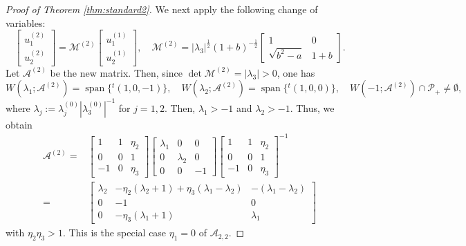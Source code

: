 \documentclass[11pt,a4paper,twosides]{amsart}
\theoremstyle{plain}
\theoremstyle{remark}
\numberwithin{equation}{section}
\DeclareMathOperator{\Span}{span}
\theoremstyle{definition}
\newcommand{\1}{{\bf 1}_{\{|x| < |t|\}}}
\begin{document}
\begin{proof}[Proof of Theorem \ref{thm:standard2}]
We next apply the following change of variables:
\[
	\begin{bmatrix}
	u_1^{(2)}\\
	u_2^{(2)}
	\end{bmatrix}
	=
	\mathscr{M}^{(2)}
	\begin{bmatrix}
	u_1^{(1)}\\
	u_2^{(1)}
	\end{bmatrix}, \quad
	\mathscr{M}^{(2)}=|\lambda_3|^{\frac12}(1+b)^{-\frac12}\begin{bmatrix}
	1& 0  \\
	\sqrt{b^2-a} & 1+b
	\end{bmatrix}.
\]
Let $\mathscr{A}^{(2)}$ be the new matrix.
Then, since $\det \mathscr{M}^{(2)}=|\lambda_3|>0$, one has 
\[
	W(\lambda_1;\mathscr{A}^{(2)})
	= \Span\{{}^t\!(1,0,-1)\}, \quad
	W(\lambda_2;\mathscr{A}^{(2)})
	= \Span\{{}^t\!(1,0,0)\}, \quad
	W(-1;\mathscr{A}^{(2)})\cap \mathcal{P}_+ \neq \emptyset,
\]
where $\lambda_j:= \lambda_j^{(0)}
|\lambda_3^{(0)}|^{-1}$ for $j=1,2$.
Then, $\lambda_1>-1$ and $\lambda_2>-1$.
Thus, we obtain
\begin{align*}
	\mathscr{A}^{(2)}
	={}& \begin{bmatrix}
	1 & 1 & \eta_2 \\
	0 & 0& 1\\
	-1 & 0& \eta_3
	\end{bmatrix}
	\begin{bmatrix}
	\lambda_1 & 0 & 0 \\
	0 & \lambda_2 & 0\\
	0 & 0 & -1
	\end{bmatrix}
	\begin{bmatrix}
	1 & 1 & \eta_2 \\
	0 & 0& 1\\
	-1 & 0& \eta_3
	\end{bmatrix}^{-1} \\
	={}& \begin{bmatrix}
	\lambda_2 & 
	-\eta_2(\lambda_2+1)  + \eta_3 (\lambda_1-\lambda_2)
	& -(\lambda_1-\lambda_2) \\
	0 & -1& 0\\
	0 & -\eta_3(\lambda_1+1)  & \lambda_1
	\end{bmatrix}
\end{align*}
with $\eta_2\eta_3>1$.
This is the special case $\eta_1=0$ of $\mathscr{A}_{2,2}$.


\end{proof}
\end{document}

